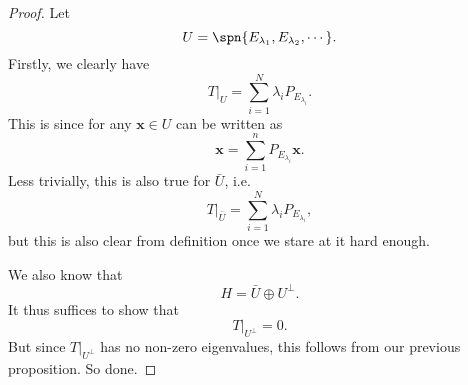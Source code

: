 \documentclass[a4paper]{article}
\begin{document}
\begin{proof}
  Let
  \[
    U = \spn\{E_{\lambda_1}, E_{\lambda_2}, \cdots\}.
  \]
  Firstly, we clearly have
  \[
    T|_U = \sum_{i = 1}^N \lambda_i P_{E_{\lambda_i}}.
  \]
  This is since for any $\mathbf{x} \in U$ can be written as
  \[
    \mathbf{x} = \sum_{i = 1}^n P_{E_{\lambda_i}} \mathbf{x}.
  \]
  Less trivially, this is also true for $\bar{U}$, i.e.
  \[
    T|_{\bar{U}} = \sum_{i = 1}^N \lambda_i P_{E_{\lambda_i}},
  \]
  but this is also clear from definition once we stare at it hard enough.

  We also know that
  \[
    H = \bar{U} \oplus U^\perp.
  \]
  It thus suffices to show that
  \[
    T|_{U^\perp} = 0.
  \]
  But since $T|_{U^\perp}$ has no non-zero eigenvalues, this follows from our previous proposition. So done.
\end{proof}
\end{document}
